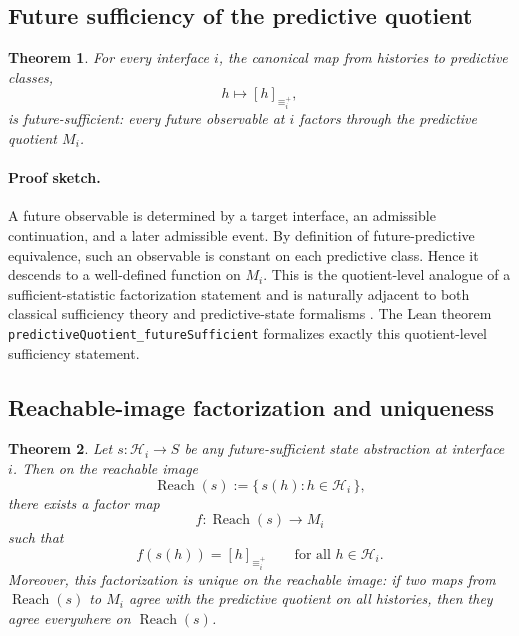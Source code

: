 \documentclass[11pt]{article}
\newcommand{\PredictiveQ}{M}
\newcommand{\Histories}{\mathcal{H}}
\newcommand{\FutureEquiv}{\equiv^{+}}
\newtheorem{theorem}{Theorem}[section]
\theoremstyle{definition}
\begin{document}
\subsection{Future sufficiency of the predictive quotient}\label{subsec:thm-sufficiency}
\begin{theorem}\label{thm:future-sufficient}
For every interface $i$, the canonical map from histories to predictive classes,
\[
h \longmapsto [h]_{\FutureEquiv_i},
\]
is future-sufficient: every future observable at $i$ factors through the predictive quotient $\PredictiveQ_i$.
\end{theorem}

\paragraph{Proof sketch.}
A future observable is determined by a target interface, an admissible continuation, and a later admissible event. By definition of future-predictive equivalence, such an observable is constant on each predictive class. Hence it descends to a well-defined function on $\PredictiveQ_i$. This is the quotient-level analogue of a sufficient-statistic factorization statement and is naturally adjacent to both classical sufficiency theory and predictive-state formalisms \citep{LehmannCasella1998TheoryPointEstimation,Jaeger2000ObservableOperatorModels,ShaliziCrutchfield2001ComputationalMechanics}. The Lean theorem \texttt{predictiveQuotient\_futureSufficient} formalizes exactly this quotient-level sufficiency statement.

\subsection{Reachable-image factorization and uniqueness}\label{subsec:thm-factorization}
\begin{theorem}\label{thm:reachable-factorization}
Let $s : \Histories_i \to S$ be any future-sufficient state abstraction at interface $i$. Then on the reachable image
\[
\operatorname{Reach}(s) := \{\,s(h) : h\in\Histories_i\,\},
\]
there exists a factor map
\[
f : \operatorname{Reach}(s) \to \PredictiveQ_i
\]
such that
\[
f(s(h)) = [h]_{\FutureEquiv_i}
\qquad
\text{for all } h\in\Histories_i.
\]
Moreover, this factorization is unique on the reachable image: if two maps from $\operatorname{Reach}(s)$ to $\PredictiveQ_i$ agree with the predictive quotient on all histories, then they agree everywhere on $\operatorname{Reach}(s)$.
\end{theorem}
\end{document}
